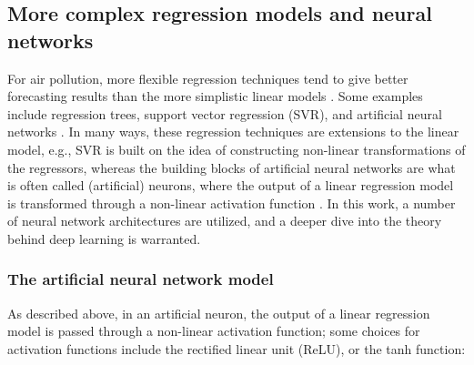 
\subsection{More complex regression models and neural networks}
\label{sec:deep_learning}
For air pollution, more flexible regression techniques tend to give better forecasting results than the more simplistic linear models \cite{atmos7020015}. Some examples include regression trees, support vector regression (SVR), and artificial neural networks \cite{atmos7020015, FaganeliPucer2018}. In many ways, these regression techniques are extensions to the linear model, e.g., SVR is built on the idea of constructing non-linear transformations of the regressors, whereas the building blocks of artificial neural networks are what is often called (artificial) neurons, where the output of a linear regression model is transformed through a non-linear activation function \cite{smlbook}. In this work, a number of neural network architectures are utilized, and a deeper dive into the theory behind deep learning is warranted. 

\subsubsection{The artificial neural network model}
As described above, in an artificial neuron, the output of a linear regression model is passed through a non-linear activation function; some choices for activation functions include the rectified linear unit (ReLU), or the tanh function:

